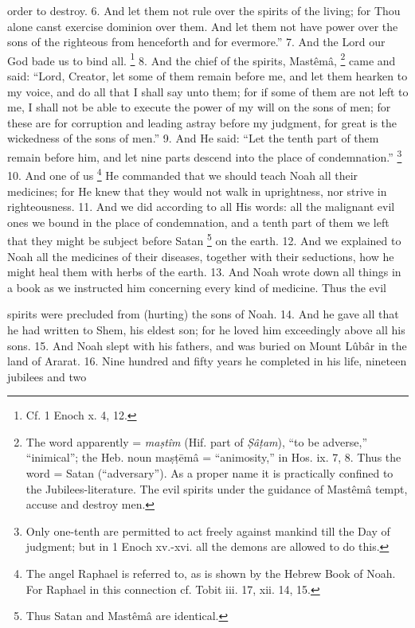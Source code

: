order to destroy. 6. And let them not rule over the spirits of the living; for Thou alone canst exercise dominion over them. And let them not have power over the sons of the righteous from henceforth and for evermore.'' 7. And the Lord our God bade us to bind all. \footnote{Cf. 1 Enoch x. 4, 12.} 8. And the chief of the spirits, Mastêmâ, \footnote{The word apparently = \emph{ma\d{s}tîm} (Hif. part of \emph{\d{S}â\d{t}am}), ``to be adverse,'' ``inimical''; the Heb. noun ma\d{s}\d{t}ēmâ = ``animosity,'' in Hos. ix. 7, 8. Thus the word = Satan (``adversary''). As a proper name it is practically confined to the Jubilees-literature. The evil spirits under the guidance of Mastêmâ tempt, accuse and destroy men.} came and said: ``Lord, Creator, let some of them remain before me, and let them hearken to my voice, and do all that I shall say unto them; for if some of them are not left to me, I shall not be able to execute the power of my will on the sons of men; for these are for corruption and leading astray before my judgment, for great is the wickedness of the sons of men.'' 9. And He said: ``Let the tenth part of them remain before him, and let nine parts descend into the place of condemnation.'' \footnote{Only one-tenth are permitted to act freely against mankind till the Day of judgment; but in 1 Enoch xv.-xvi. all the demons are allowed to do this.} 10. And one of us \footnote{The angel Raphael is referred to, as is shown by the Hebrew Book of Noah. For Raphael in this connection cf. Tobit iii. 17, xii. 14, 15.} He commanded that we should teach Noah all their medicines; for He knew that they would not walk in uprightness, nor strive in righteousness. 11. And we did according to all His words: all the malignant evil ones we bound in the place of condemnation, and a tenth part of them we left that they might be subject before Satan \footnote{Thus Satan and Mastêmâ are identical.} on the earth. 12. And we explained to Noah all the medicines of their diseases, together with their seductions, how he might heal them with herbs of the earth. 13. And Noah wrote down all things in a book as we instructed him concerning every kind of medicine. Thus the evil

spirits were precluded from (hurting) the sons of Noah. 14. And he gave all that he had written to Shem, his eldest son; for he loved him exceedingly above all his sons. 15. And Noah slept with his fathers, and was buried on Mount Lûbâr in the land of Ararat. 16. Nine hundred and fifty years he completed in his life, nineteen jubilees and two

